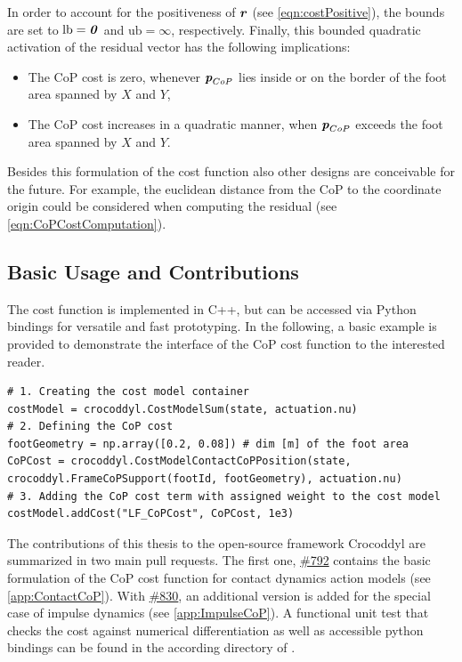 In order to account for the positiveness of $\bm{\mathit{r}}$ (see \cref{eqn:costPositive}), the bounds are set to $\text{lb}=\bm{\mathit{0}}$ and $\text{ub}=\infty$, respectively. Finally, this bounded quadratic activation of the residual vector has the following implications:
\begin{itemize}
\item The \gls{CoP} cost is zero, whenever $\bm{\mathit{p}}_{CoP}$ lies inside or on the border of the foot area spanned by $X$ and $Y$,
\item The \gls{CoP} cost increases in a quadratic manner, when $\bm{\mathit{p}}_{CoP}$ exceeds the foot area spanned by $X$ and $Y$.
\end{itemize}  
Besides this formulation of the cost function also other designs are conceivable for the future. For example, the euclidean distance from the CoP to the coordinate origin could be considered when computing the residual (see  \cref{eqn:CoPCostComputation}).

\subsection{Basic Usage and Contributions}
The cost function is implemented in C++, but can be accessed via Python bindings for versatile and fast prototyping. In the following, a basic example is provided to demonstrate the interface of the \gls{CoP} cost function to the interested reader.
\begin{verbatim}
# 1. Creating the cost model container
costModel = crocoddyl.CostModelSum(state, actuation.nu)
# 2. Defining the CoP cost
footGeometry = np.array([0.2, 0.08]) # dim [m] of the foot area
CoPCost = crocoddyl.CostModelContactCoPPosition(state, 
crocoddyl.FrameCoPSupport(footId, footGeometry), actuation.nu)
# 3. Adding the CoP cost term with assigned weight to the cost model
costModel.addCost("LF_CoPCost", CoPCost, 1e3)
\end{verbatim}

The contributions of this thesis to the open-source framework Crocoddyl are summarized in two main pull requests. The first one, \href{https://github.com/loco-3d/crocoddyl/pull/792}{\#792} contains the basic formulation of the \gls{CoP} cost function for contact dynamics action models (see \cref{app:ContactCoP}). With \href{https://github.com/loco-3d/crocoddyl/pull/830}{\#830}, an additional version is added for the special case of impulse dynamics (see \cref{app:ImpulseCoP}).
A functional unit test that checks the cost against numerical differentiation as well as accessible python bindings can be found in the according directory of \cite{crocoddylweb}.


